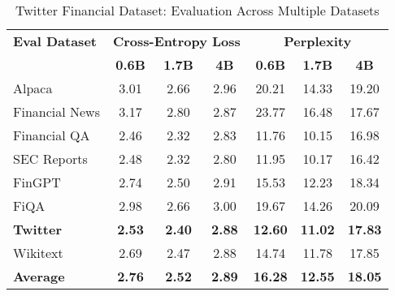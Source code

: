 
\begin{table}[htbp]
\centering
\caption[Twitter Financial: Evaluation Results]{Twitter Financial Dataset: Evaluation Across Multiple Datasets}
\label{tab:twitter_results}
\begin{tabular}{l|ccc|ccc}
\hline
\textbf{Eval Dataset} & \multicolumn{3}{c|}{\textbf{Cross-Entropy Loss}} & \multicolumn{3}{c}{\textbf{Perplexity}} \\
\cline{2-4} \cline{5-7}
  & \textbf{0.6B} & \textbf{1.7B} & \textbf{4B} & \textbf{0.6B} & \textbf{1.7B} & \textbf{4B} \\
Alpaca & 3.01 & 2.66 & 2.96 & 20.21 & 14.33 & 19.20 \\
Financial News & 3.17 & 2.80 & 2.87 & 23.77 & 16.48 & 17.67 \\
Financial QA & 2.46 & 2.32 & 2.83 & 11.76 & 10.15 & 16.98 \\
SEC Reports & 2.48 & 2.32 & 2.80 & 11.95 & 10.17 & 16.42 \\
FinGPT & 2.74 & 2.50 & 2.91 & 15.53 & 12.23 & 18.34 \\
FiQA & 2.98 & 2.66 & 3.00 & 19.67 & 14.26 & 20.09 \\
\textbf{Twitter} & \textbf{2.53} & \textbf{2.40} & \textbf{2.88} & \textbf{12.60} & \textbf{11.02} & \textbf{17.83} \\
Wikitext & 2.69 & 2.47 & 2.88 & 14.74 & 11.78 & 17.85 \\
\hline
\textbf{Average} & \textbf{2.76} & \textbf{2.52} & \textbf{2.89} & \textbf{16.28} & \textbf{12.55} & \textbf{18.05} \\
\hline
\end{tabular}
\end{table}
